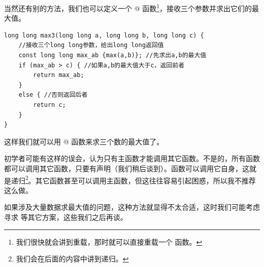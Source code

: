 当然还有别的方法，我们也可以定义一个 @ 函数\footnote{我们很快就会讲到重载，那时就可以直接重载一个 \lstinline@max@ 函数。}，接收三个参数并求出它们的最大值。
\begin{lstlisting}
long long max3(long long a, long long b, long long c) {
    //接收三个long long参数，给出long long返回值
    const long long max_ab {max(a,b)}; //先求出a,b的最大值
    if (max_ab > c) { //如果a,b的最大值大于c，返回前者
        return max_ab;
    }
    else { //否则返回后者
        return c;
    }
}
\end{lstlisting}
这样我们就可以用 @ 函数来求三个数的最大值了。\par
初学者可能有这样的误会，认为只有主函数才能调用其它函数。不是的，所有函数都可以调用其它函数，只要有声明（我们稍后谈到）。函数可以调用它自身，这就是递归\footnote{我们会在后面的内容中讲到递归。}。其它函数甚至可以调用主函数，但这往往容易引起困惑，所以我不推荐这么做。\par
如果涉及大量数据求最大值的问题，这种方法就显得不太合适，这时我们可能考虑寻求 \lstinline@valarray@ 等其它方案，这些我们之后再谈。\par
